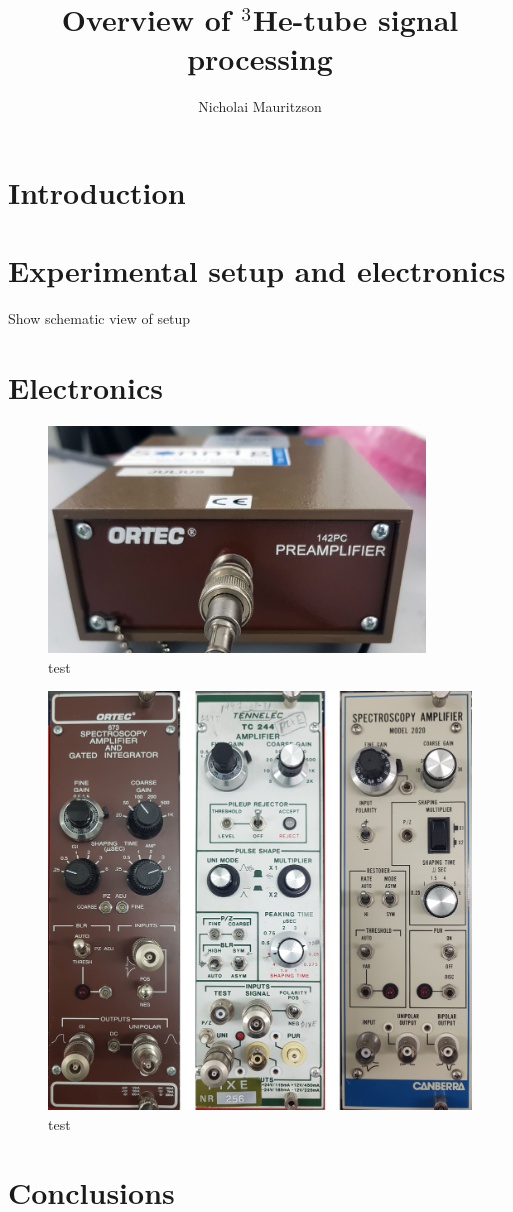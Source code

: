\documentclass[12pt,a4paper]{report}
\author{Nicholai Mauritzson}
\title{Overview of $^3$He-tube signal processing}
\begin{document}
\maketitle

\section*{Introduction}
\section*{Experimental setup and electronics}
Show schematic view of setup 
\section*{Electronics}
\begin{figure}[H]
\centering
\includegraphics[width=100mm]{figs/preamp.jpg}
\caption{test}
\label{fig:preamp}
\end{figure}

\begin{figure}[H]
\centering
\includegraphics[width=135mm]{figs/shaper_amp_overview.jpg}
\caption{test}
\label{fig:shaper_amp_overview}
\end{figure}

\section*{Conclusions}
\end{document}
